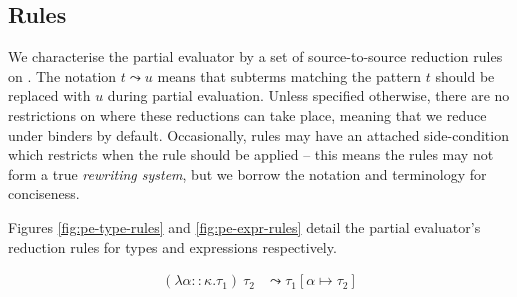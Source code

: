 \documentclass[runningheads]{llncs}
\begin{document}
\subsection{Rules}

We characterise the partial evaluator by a set of source-to-source reduction rules on \core{}. The notation $t \leadsto u$ means that subterms matching the pattern $t$ should be replaced with $u$ during partial evaluation. Unless specified otherwise, there are no restrictions on where these reductions can take place, meaning that we reduce under binders by default. Occasionally, rules may have an attached side-condition which restricts when the rule should be applied -- this means the rules may not form a true \emph{rewriting system}\cite{jay1991long}, but we borrow the notation and terminology for conciseness.

Figures \ref{fig:pe-type-rules} and \ref{fig:pe-expr-rules} detail the partial evaluator's reduction rules for types and expressions respectively.


\begin{figure*}[h]

  \begin{minipage}[c]{\textwidth}
    \begin{align}
      (\lambda \alpha :: \kappa . \tau_1)\ \tau_2 &\leadsto \tau_1[\alpha \mapsto \tau_2]
    \end{align}
  \end{minipage}

  \caption{Reduction rules for partially evaluating types.}
  \label{fig:pe-type-rules}
\end{figure*}

\end{document}
